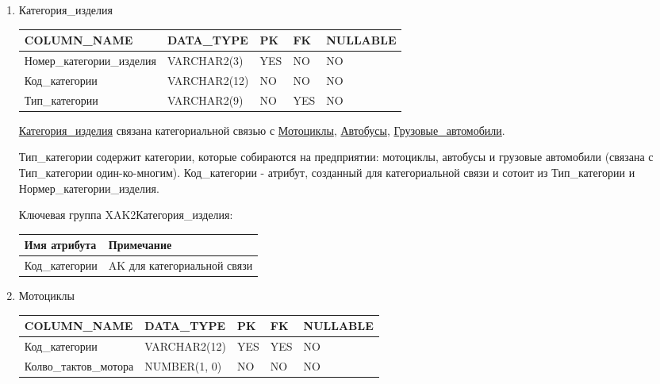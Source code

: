 \begin{enumerate}
\begin{tabular}{|p{7cm}|p{9.3cm}|}
    \end{tabular}


    \item{Категория\_изделия}

    \begin{tabular}{|p{7cm}|p{3cm}|p{1cm}|p{1cm}|p{3cm}|} \hline

        {\bf COLUMN\_NAME} & {\bf DATA\_TYPE} & {\bf PK} & {\bf FK} & {\bf NULLABLE} \\ \hline
        Номер\_категории\_изделия & VARCHAR2(3) & YES & NO & NO \\ \hline
        Код\_категории & VARCHAR2(12) & NO & NO & NO \\ \hline
        Тип\_категории & VARCHAR2(9) & NO & YES & NO \\ \hline

    \end{tabular}

    \underline{Категория\_изделия} связана категориальной связью с \underline{Мотоциклы}, \underline{Автобусы}, \underline{Грузовые\_автомобили}.

    Тип\_категории содержит категории, которые собираются на предприятии: мотоциклы, автобусы и грузовые автомобили (связана с Тип\_категории один-ко-многим).
    Код\_категории - атрибут, созданный для категориальной связи и сотоит из Тип\_категории и Нормер\_категории\_изделия.

    Ключевая группа XAK2Категория\_изделия:

    \begin{tabular}{|p{7cm}|p{9.3cm}|} \hline

        {\bf Имя атрибута} & {\bf Примечание} \\ \hline
        Код\_категории & AK для категориальной связи \\ \hline

    \end{tabular}

    \item{Мотоциклы}

    \begin{tabular}{|p{7cm}|p{3cm}|p{1cm}|p{1cm}|p{3cm}|} \hline

        {\bf COLUMN\_NAME} & {\bf DATA\_TYPE} & {\bf PK} & {\bf FK} & {\bf NULLABLE} \\ \hline
        Код\_категории & VARCHAR2(12) & YES & YES & NO \\ \hline
        Колво\_тактов\_мотора & NUMBER(1, 0) & NO & NO & NO \\ \hline


\end{tabular}
\end{enumerate}
